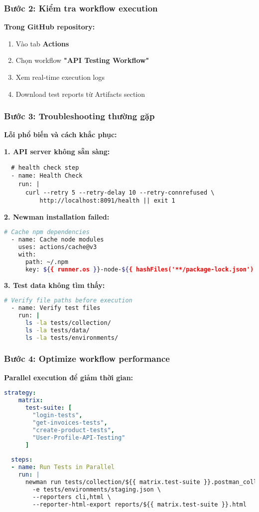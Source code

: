 \documentclass[12pt,a4paper]{article}
\begin{document}
  \subsubsection{Bước 2: Kiểm tra workflow execution}

  \textbf{Trong GitHub repository:}
  \begin{enumerate}
  \item Vào tab \textbf{Actions}
  \item Chọn workflow \textbf{"API Testing Workflow"}
  \item Xem real-time execution logs
  \item Download test reports từ Artifacts section
  \end{enumerate}

  \subsubsection{Bước 3: Troubleshooting thường gặp}

  \textbf{Lỗi phổ biến và cách khắc phục:}

  \textbf{1. API server không sẵn sàng:}
  \begin{lstlisting}
  # health check step
  - name: Health Check
    run: |
      curl --retry 5 --retry-delay 10 --retry-connrefused \
          http://localhost:8091/health || exit 1
  \end{lstlisting}

  \textbf{2. Newman installation failed:}
  \begin{lstlisting}[language=bash]
  # Cache npm dependencies
  - name: Cache node modules
    uses: actions/cache@v3
    with:
      path: ~/.npm
      key: ${{ runner.os }}-node-${{ hashFiles('**/package-lock.json') }}
  \end{lstlisting}

  \textbf{3. Test data không tìm thấy:}
  \begin{lstlisting}[language=bash]
  # Verify file paths before execution
  - name: Verify test files
    run: |
      ls -la tests/collection/
      ls -la tests/data/
      ls -la tests/environments/
  \end{lstlisting}

  \subsubsection{Bước 4: Optimize workflow performance}

  \textbf{Parallel execution để giảm thời gian:}
  \begin{lstlisting}[language=yaml]
  strategy:
    matrix:
      test-suite: [
        "login-tests",
        "get-invoices-tests", 
        "create-product-tests",
        "User-Profile-API-Testing"
      ]
      
  steps:
  - name: Run Tests in Parallel
    run: |
      newman run tests/collection/${{ matrix.test-suite }}.postman_collection.json \
        -e tests/environments/staging.json \
        --reporters cli,html \
        --reporter-html-export reports/${{ matrix.test-suite }}.html
  \end{lstlisting}
\end{document}

